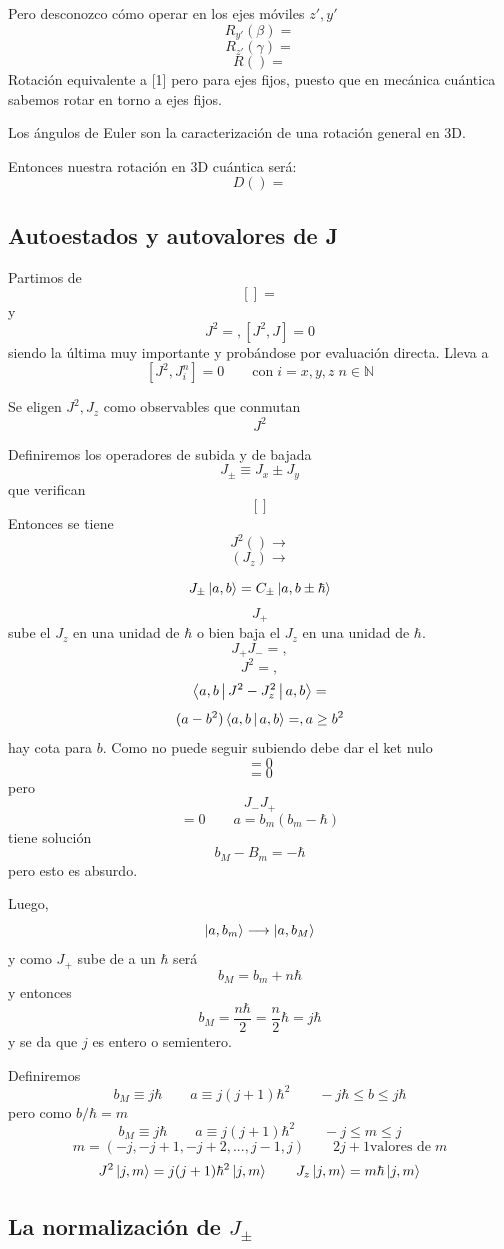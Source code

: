 \documentclass[10pt,oneside]{CBFT_book}
\begin{document}
Pero desconozco cómo operar en los ejes móviles $z',y'$
\[
	R_{y'}(\beta) =
\]
\[
	R_{z'}(\gamma) =
\]
\[
	R() =
\]
Rotación equivalente a [1] pero para ejes fijos, puesto que en mecánica cuántica sabemos rotar en torno a 
ejes fijos.

Los ángulos de Euler son la caracterización de una rotación general en 3D.

Entonces nuestra rotación en 3D cuántica será:
\[
	D() =
\]

\subsection{Autoestados y autovalores de J}

Partimos de 
\[
	[] = 
\]
y
\[
	J^2 = , [J^2,J] = 0
\]
siendo la última muy importante y probándose por evaluación directa. Lleva a 
\[
	[J^2,J_i^n] = 0 \qquad \text{con} \; i=x,y,z \; n\in\mathbb{N}
\]

Se eligen $J^2, J_z$ como observables que conmutan 
\[
	J^2
\]

Definiremos los operadores de subida y de bajada
\[
	J_{\pm} \equiv J_x \pm J_y
\]
que verifican 
\[
	[]
\]
Entonces se tiene 
\[
	J^2() \longrightarrow 
\]
\[
	(J_z) \longrightarrow
\]

\[
	J_{\pm} \Ket{a,b} = C_{\pm} \Ket{a,b\pm\hbar}
\]
\[
	J_+
\]
sube el $J_z$ en una unidad de $\hbar$ o bien baja el $J_z$ en una unidad de $\hbar$.
\[
	J_+J_- =  ,
\]
\[
	J^2 = ,  
\]
\[
	\Braket{a,b|J^2 - J^2_z|a,b} = 
\]
\[
	(a-b^2)\Braket{a,b|a,b} = , a \geq b^2
\]
hay cota para $b$.
Como no puede seguir subiendo debe dar el ket nulo 
\[
	= 0
\]
\[
	= 0
\]
pero 
\[
	J_-J_+
\]
\[
	= 0	\qquad a = b_m(b_m-\hbar)
\]
tiene solución 
\[
	b_M - B_m = - \hbar
\]
pero esto es absurdo.

Luego,
\[
	\Ket{a,b_m} \longrightarrow \Ket{a,b_M}
\]
y como $J_+$ sube de a un $\hbar$ será
\[
	b_M = b_m + n\hbar
\]
y entonces
\[
	b_M = \frac{n\hbar}{2} = \frac{n}{2} \hbar = j \hbar
\]
y se da que $j$ es entero o semientero.

Definiremos 
\[
	b_M \equiv j \hbar \qquad a \equiv j (j+1) \hbar^2 \qquad -j\hbar \leq b \leq j\hbar
\]
pero como $b/\hbar = m$
\[
	b_M \equiv j \hbar \qquad a \equiv j (j+1) \hbar^2 \qquad -j \leq m \leq j
\]
\[
	m = (-j,-j+1,-j+2,...,j-1,j) \qquad 2j+1 \text{valores de} \; m
\]
\[
	J^2 \Ket{j,m} = j( j+1 )\hbar^2\Ket{j,m} \qquad J_z \Ket{j,m} = m \hbar \Ket{j,m}
\]

\subsection{La normalización de $J_\pm$}
\end{document}
